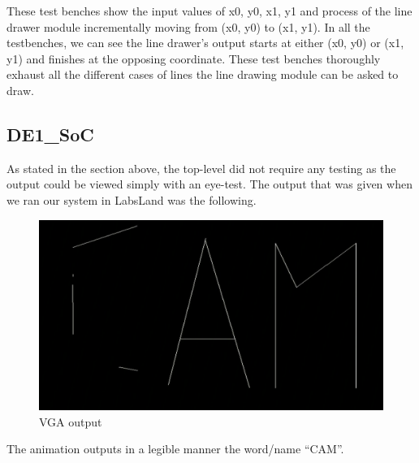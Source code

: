 \documentclass[11pt, titlepage]{article}
\begin{document}
\begin{description}
                These test benches show the input values of x0, y0, x1, y1 and process of the line drawer module incrementally moving from (x0, y0) to (x1, y1). In all the testbenches, we can see the line drawer's output starts at either (x0, y0) or (x1, y1) and finishes at the opposing coordinate. These test benches thoroughly exhaust all the different cases of lines the line drawing module can be asked to draw. 
            \end{description}

        \subsection{DE1\_SoC}
            As stated in the section above, the top-level did not require any testing as the output could be viewed simply with an eye-test. The output that was given when we ran our system in LabsLand was the following. \\
            \begin{figure}[H]
                \centering
                \includegraphics[scale = 0.5]{Images/VGA output.png}
                \caption{VGA output}
            \end{figure}
            The animation outputs in a legible manner the word/name “CAM”.
        \newpage
\end{document}
